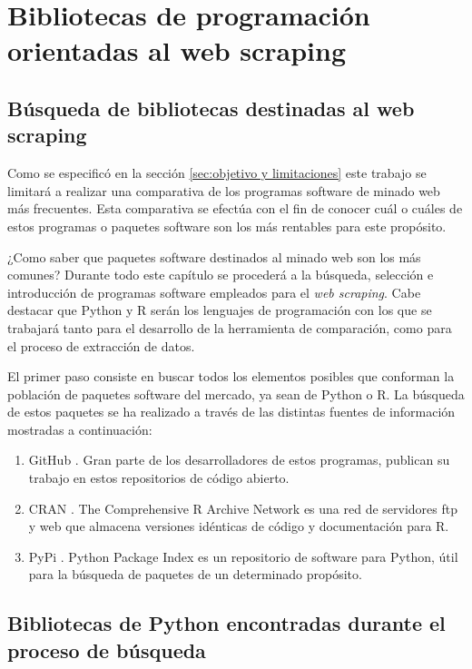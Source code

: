 \chapter{Bibliotecas de programación orientadas al web scraping}
\label{cha:bibliotecas de programacion orientadas al web scraping}

\section{Búsqueda de bibliotecas destinadas al web scraping}
\label{sec:busqueda de bibliotecas destinadas al web scraping}

Como se especificó en la sección \ref{sec:objetivo y limitaciones} este trabajo se limitará a realizar
una comparativa de los programas software de minado web más frecuentes. Esta comparativa se efectúa con el
fin de conocer cuál o cuáles de estos programas o paquetes software son los más rentables para este propósito.

¿Como saber que paquetes software destinados al minado web son los más comunes? Durante todo este capítulo
se procederá a la búsqueda, selección e introducción de programas software empleados para el \emph{web 
scraping}. Cabe destacar que Python y R serán los lenguajes de programación con los que se trabajará tanto 
para el desarrollo de la herramienta de comparación, como para el proceso de extracción de datos.

El primer paso consiste en buscar todos los elementos posibles que conforman la población de paquetes
software del mercado, ya sean de Python o R. La búsqueda de estos paquetes se ha realizado a través de las 
distintas fuentes de información mostradas a continuación:

\begin{enumerate}
  \item GitHub \cite{github}. Gran parte de los desarrolladores de estos programas, publican su trabajo en
  estos repositorios de código abierto.
  \item CRAN \cite{cran}. The Comprehensive R Archive Network es una red de servidores ftp y web que
  almacena versiones idénticas de código y documentación para R.
  \item PyPi \cite{pypi}. Python Package Index es un repositorio de software para Python, útil para la
  búsqueda de paquetes de un determinado propósito.
\end{enumerate}

\section{Bibliotecas de Python encontradas durante el proceso de búsqueda}
\label{sec:bibliotecas de python encontradas durante el proceso de busqueda}

